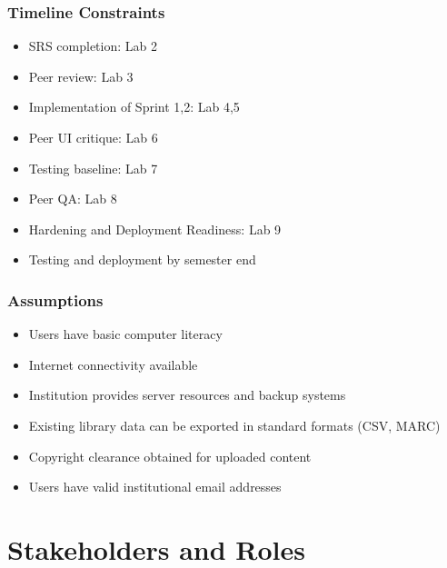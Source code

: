 \documentclass[12pt,a4paper]{report}
\begin{document}
\subsection{Timeline Constraints}
\begin{itemize}
    \item SRS completion: Lab 2
    \item Peer review: Lab 3
    \item Implementation of Sprint 1,2: Lab 4,5
    \item Peer UI critique: Lab 6
    \item Testing baseline: Lab 7
    \item Peer QA: Lab 8
    \item Hardening and Deployment Readiness: Lab 9
    \item Testing and deployment by semester end
\end{itemize}

\subsection{Assumptions}
\begin{itemize}
    \item Users have basic computer literacy
    \item Internet connectivity available
    \item Institution provides server resources and backup systems
    \item Existing library data can be exported in standard formats (CSV, MARC)
    \item Copyright clearance obtained for uploaded content
    \item Users have valid institutional email addresses
\end{itemize}

\chapter{Stakeholders and Roles}
\end{document}
